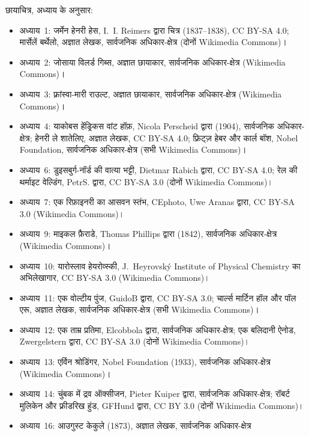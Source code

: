 \bigskip
\noindent छायाचित्र, अध्याय के अनुसार:
\begin{itemize}\small
  \item अध्याय~1: जर्मेन हेनरी हेस, I.~I. Reimers द्वारा चित्र (1837--1838),
        CC BY-SA 4.0; मार्सेलें बर्थेलो, अज्ञात लेखक, सार्वजनिक अधिकार-क्षेत्र
        (दोनों Wikimedia Commons)।
  \item अध्याय~2: जोसाया विलर्ड गिब्स, अज्ञात छायाकार, सार्वजनिक अधिकार-क्षेत्र
        (Wikimedia Commons)।
  \item अध्याय~3: फ़्रांस्वा-मारी राउल्ट, अज्ञात छायाकार, सार्वजनिक अधिकार-क्षेत्र
        (Wikimedia Commons)।
  \item अध्याय~4: याकोबस हेंड्रिकस वांट हॉफ़, Nicola Perscheid द्वारा (1904),
        सार्वजनिक अधिकार-क्षेत्र; हेनरी ले शातेलिए, अज्ञात लेखक, CC BY-SA 4.0;
        फ़्रिट्ज़ हेबर और कार्ल बॉश, Nobel Foundation, सार्वजनिक अधिकार-क्षेत्र (सभी
        Wikimedia Commons)।
  \item अध्याय~6: डुइसबुर्ग-नॉर्ड की वात्या भट्टी, Dietmar Rabich द्वारा, CC BY-SA
        4.0; रेल की थर्माइट वेल्डिंग, PetrS. द्वारा, CC BY-SA 3.0 (दोनों
        Wikimedia Commons)।
  \item अध्याय~7: एक रिफ़ाइनरी का आसवन स्तंभ, CEphoto, Uwe Aranas द्वारा,
        CC BY-SA 3.0 (Wikimedia Commons)।
  \item अध्याय~9: माइकल फ़ैराडे, Thomas Phillips द्वारा (1842), सार्वजनिक अधिकार-क्षेत्र
        (Wikimedia Commons)।
  \item अध्याय~10: यारोस्लाव हेयरोव्स्की, J.~Heyrovsk\'y Institute of Physical
        Chemistry का अभिलेखागार, CC BY-SA 3.0 (Wikimedia Commons)।
  \item अध्याय~11: एक वोल्टीय पुंज, GuidoB द्वारा, CC BY-SA 3.0; चार्ल्स मार्टिन हॉल
        और पॉल एरू, अज्ञात लेखक, सार्वजनिक अधिकार-क्षेत्र (सभी Wikimedia
        Commons)।
  \item अध्याय~12: एक ताम्र प्रतिमा, Elcobbola द्वारा, सार्वजनिक अधिकार-क्षेत्र; एक बलिदानी
        ऐनोड, Zwergelstern द्वारा, CC BY-SA 3.0 (दोनों Wikimedia Commons)।
  \item अध्याय~13: एर्विन श्रोडिंगर, Nobel Foundation (1933), सार्वजनिक अधिकार-क्षेत्र
        (Wikimedia Commons)।
  \item अध्याय~14: चुंबक में द्रव ऑक्सीजन, Pieter Kuiper द्वारा, सार्वजनिक अधिकार-क्षेत्र;
        रॉबर्ट मुलिकेन और फ़्रीडरिख हुंड, GFHund द्वारा, CC BY 3.0 (दोनों Wikimedia
        Commons)।
  \item अध्याय~16: आउगुस्ट केकुले (1873), अज्ञात लेखक, सार्वजनिक अधिकार-क्षेत्र

\end{itemize}
